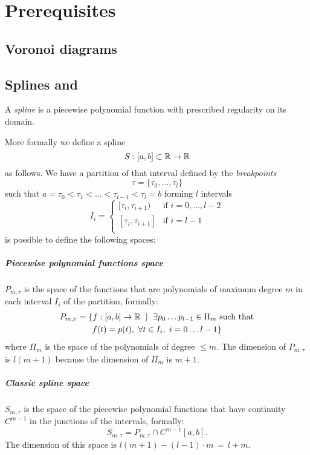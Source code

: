 \documentclass[dissertation.tex]{subfiles}
\begin{document}
\chapter{Prerequisites}
\section{Voronoi diagrams}\label{sec:voronoi}
\section{Splines and \bss}\label{sec:spline}
A \emph{spline} is a piecewise polynomial function with prescribed
regularity on its domain.

More formally we define a spline \cite{deboor}\cite{farin}
$$S:[a,b]\subset\mathbb{R}\rightarrow\mathbb{R}$$
as follows.
We have a partition of that interval defined by the \emph{breakpoints}
$$\tau = \{\tau_0,\dots,\tau_l\}$$
such that $a=\tau_0<\tau_1<\dots<\tau_{l-1}<\tau_l=b$ forming $l$
intervals
$$
I_i=
\begin{cases}
  [\tau_i,\tau_{i+1}) & \mbox{if } i=0,\dots,l-2\\
    [\tau_i,\tau_{i+1}] & \mbox{if } i=l-1\\
\end{cases}
$$
is possible to define the following spaces:
\paragraph{Piecewise polynomial functions space} $P_{m,\tau}$
is the space of the functions that are polynomials of maximum degree $m$
in each interval $I_i$ of the partition, formally:
\begin{multline*}
  P_{m,\tau}=\{f:[a,b]\rightarrow\mathbb{R}\ \mid\ \exists p_0\dots
  p_{l-1}\in\Pi_m \ \text{such that}\\
  f(t)=p(t),\ \forall t\in I_i,\
  i=0\dots l-1\}
\end{multline*}
where $\Pi_m$ is the space of the polynomials of degree $\le m$. The
dimension of $P_{m,\tau}$ is $l(m+1)$ because the dimension of $\Pi_m$
is $m+1$.
\paragraph{Classic spline space} $S_{m,\tau}$ is the space of
the piecewise polynomial functions that have continuity $C^{m-1}$ in
the junctions of the intervals, formally:
$$
S_{m,\tau}=P_{m,\tau}\cap C^{m-1}[a,b].
$$
The dimension of this space is $l(m+1)-(l-1)\cdot m\,=\,l+m$.
\end{document}
